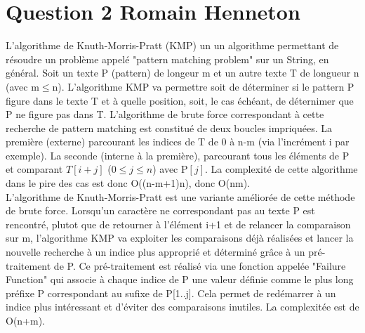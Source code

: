 \documentclass[10pt,a4paper]{article}
\begin{document}
\section*{Question 2 Romain Henneton}
L'algorithme de Knuth-Morris-Pratt (KMP) un un algorithme permettant de résoudre un problème appelé "pattern matching problem" sur un String, en général. Soit un texte P (pattern) de longeur m et un autre texte T de longueur n (avec m$\leq$n). L'algorithme KMP va permettre soit de déterminer si le pattern P figure dans le texte T et à quelle position, soit, le cas échéant, de déternimer que P ne figure pas dans T.
L'algorithme de brute force correspondant à cette recherche de pattern matching est constitué de deux boucles impriquées. La première (externe) parcourant les indices de T de 0 à n-m (via l'incrément i par exemple). La seconde (interne à la première), parcourant tous les éléments de P et comparant $T[i+j]$ ($0\leq j\leq n$) avec P$[j]$. La complexité de cette algorithme dans le pire des cas est donc O((n-m+1)n), donc O(nm).\\
L'algorithme de Knuth-Morris-Pratt est une variante améliorée de cette méthode de brute force. Lorsqu'un caractère ne correspondant pas au texte P est rencontré, plutot que de retourner à l'élément i+1 et de relancer la comparaison sur m, l'algorithme KMP va exploiter les comparaisons déjà réalisées et lancer la nouvelle recherche à un indice plus approprié et déterminé grâce à un pré-traitement de P. Ce pré-traitement est réalisé via une fonction appelée "Failure Function" qui associe à chaque indice de P une valeur définie comme le plus long préfixe P correspondant au sufixe de P[1..j]. Cela permet de redémarrer à un indice plus intéressant et d'éviter des comparaisons inutiles. La complexitée est de O(n+m).
\end{document}
